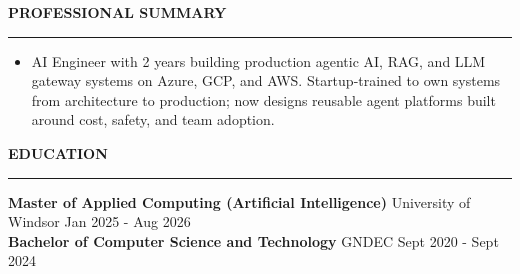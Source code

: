 \documentclass{resume}
\newcommand{\bulletgap}{-3pt}   %
\def\sectionskip{\vspace{12pt}}     %
\renewenvironment{rSection}[1]{%
  \sectionskip
  {\large\bfseries\MakeUppercase{#1}}%
  \sectionlineskip
  \hrule
  \begin{list}{}{\setlength{\leftmargin}{0em}}
  \item[]
}{%
  \end{list}
  \vspace{-0.5em}
}
\begin{document}
\begin{rSection}{Professional Summary}
\begin{itemize}[leftmargin=0.15in]
\itemsep \bulletgap {}
    \item AI Engineer with 2 years building production agentic AI, RAG, and LLM gateway systems on Azure, GCP, and AWS. Startup-trained to own systems from architecture to production; now designs reusable agent platforms built around cost, safety, and team adoption.
\end{itemize}
\end{rSection}

\begin{rSection}{Education}
{\bf Master of Applied Computing (Artificial Intelligence)} \textbar{} University of Windsor \hfill Jan 2025 - Aug 2026\\
{\bf Bachelor of Computer Science and Technology} \textbar{} GNDEC \hfill Sept 2020 - Sept 2024
\end{rSection}
\end{document}
